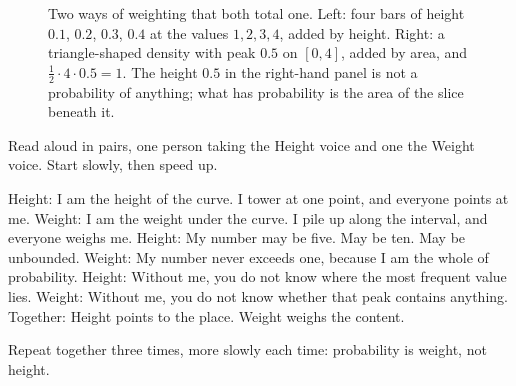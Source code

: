 \begin{figure}[htbp]
\centering
{}
\caption{Two ways of weighting that both total one. Left: four bars
of height $0.1$, $0.2$, $0.3$, $0.4$ at the values $1,2,3,4$, added by
height. Right: a triangle-shaped density with peak $0.5$ on $[0,4]$,
added by area, and $\tfrac12\cdot4\cdot0.5=1$. The height $0.5$ in the right-hand panel
is not a probability of anything; what has probability is the area of the slice beneath it.}
\label{fig:batang-dan-kurva}
\end{figure}

\begin{bacakeras}
Read aloud in pairs, one person taking the Height voice and one the Weight voice. Start
slowly, then speed up.

Height: I am the height of the curve. I tower at one point, and everyone points at me.
Weight: I am the weight under the curve. I pile up along the interval, and everyone weighs me.
Height: My number may be five. May be ten. May be unbounded.
Weight: My number never exceeds one, because I am the whole of probability.
Height: Without me, you do not know where the most frequent value lies.
Weight: Without me, you do not know whether that peak contains anything.
Together: Height points to the place. Weight weighs the content.

Repeat together three times, more slowly each time: probability is weight, not height.
\end{bacakeras}

